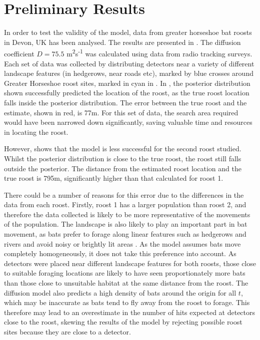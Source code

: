 
\chapter{Preliminary Results}
\label{chapter:results}

In order to test the validity of the model, data from greater horseshoe bat
roosts in Devon, UK has been analysed. The results are presented in
. The diffusion coefficient $D = 75.5$
m\textsuperscript{2}s\textsuperscript{-1} was calculated using data from radio
tracking surveys. Each set of data was collected by distributing detectors near
a variety of different landscape features (in hedgerows, near roads etc), marked
by blue crosses around Greater Horseshoe roost sites, marked in cyan in . In
, the posterior distribution shown successfully
predicted the location of the roost, as the true roost location falls inside the
posterior distribution. The error between the true roost and the estimate,
shown in red, is 77m. For this set of data, the search area required would have
been narrowed down significantly, saving valuable time and resources in locating
the roost.

However,  shows that the model is less successful for
the second roost studied. Whilst the posterior distribution is close to the true
roost, the roost still falls outside the posterior. The distance from the
estimated roost location and the true roost is 795m, significantly higher than
that calculated for roost 1.

There could be a number of reasons for this error due to the differences in the
data from each roost. Firstly, roost 1 has a larger population than roost 2, and
therefore the data collected is likely to be more representative of the
movements of the population. The landscape is also likely to play an important
part in bat movement, as bats prefer to forage along linear features such as
hedgerows and rivers and avoid noisy or brightly lit areas \cite{Stone2009}. As the model assumes
bats move completely homogeneously, it does not take this preference into
account. As detectors were placed near different landscape features for both
roosts, those close to suitable foraging locations are likely to have seen
proportionately more bats than those close to unsuitable habitat at the same
distance from the roost. The diffusion model also predicts a high density of
bats around the origin for all $t$, which may be inaccurate as bats tend to fly
away from the roost to forage. This therefore may lead to an overestimate in the
number of hits expected at detectors close to the roost, skewing the results
of the model by rejecting possible roost sites because they are close to a
detector.


